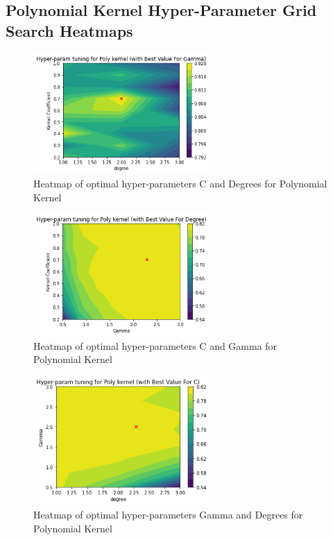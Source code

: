 \subsection{Polynomial Kernel Hyper-Parameter Grid Search Heatmaps}
\begin{figure}[h!]
    \includegraphics[width=0.6\textwidth]{figures/final/poly_c_d.png}
    \caption{\label{fig:poly_c_d} Heatmap of optimal hyper-parameters C and Degrees for Polynomial Kernel}
\end{figure}
\begin{figure}[h!]
    \includegraphics[width=0.6\textwidth]{figures/final/poly_c_g.png}
    \caption{\label{fig:poly_c_g} Heatmap of optimal hyper-parameters C and Gamma for Polynomial Kernel}
\end{figure}
\begin{figure}[h!]
    \includegraphics[width=0.6\textwidth]{figures/final/poly_g_d.png}
    \caption{\label{fig:poly_g_d} Heatmap of optimal hyper-parameters Gamma and Degrees for Polynomial Kernel}
\end{figure}
